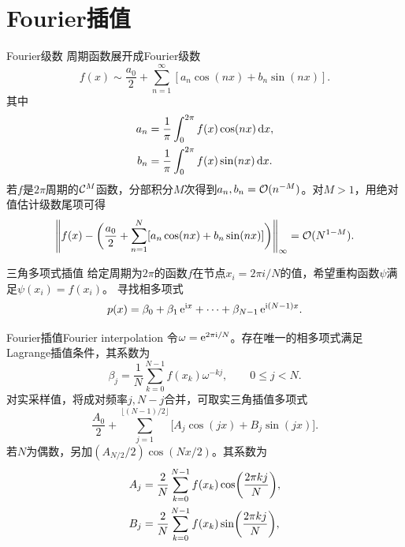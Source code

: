 \section{Fourier插值}
\label{sec:Fourier interpolation}

\begin{definition}
    {Fourier级数}{}
    周期函数展开成Fourier级数
    \begin{equation}
        f(x) \sim \frac{a_0}2 + \sum_{n=1}^\infty[a_n\cos(nx) + b_n\sin(nx)].
    \end{equation}
    其中
    \begin{subequations}
        \begin{align}
            a_n &= \frac1\pi\int_0^{2\pi}f(x)\cos(nx)\mathop{}\!\mathrm{d} x,\\
            b_n &= \frac1\pi\int_0^{2\pi}f(x)\sin(nx)\mathop{}\!\mathrm{d} x.
        \end{align}
    \end{subequations}
    \tcblower
    若$f$是$2\pi$周期的$\mathcal{C}^M$函数，分部积分$M$次得到$a_n,b_n = \mathcal{O}(n^{-M})$。对$M > 1$，用绝对值估计级数尾项可得
    \[
        \Biggl\lVert f(x) - \biggl(\frac{a_0}2 + \sum_{n=1}^N[a_n\cos(nx) + b_n\sin(nx)]\biggr)\Biggr\rVert_\infty = \mathcal{O}(N^{1-M}).
    \] 
\end{definition}

\begin{definition}
    {三角多项式插值}{}
    给定周期为$2\pi$的函数$f$在节点$x_i = 2\pi i/N$的值，希望重构函数$\psi$满足$\psi(x_i) = f(x_i)$。
    \tcblower
    寻找相多项式
    \begin{equation}
        p(x) = \beta_0 + \beta_1\mathop{}\!\mathrm{e}^{\mathrm{i} x} + \cdots + \beta_{N-1}\mathop{}\!\mathrm{e}^{\mathrm{i}(N-1)x}.
    \end{equation}
\end{definition}

\begin{theorem}
    {Fourier插值}{Fourier interpolation}
    令$\omega = \mathop{}\!\mathrm{e}^{2\pi\mathrm{i}/N}$。存在唯一的相多项式满足Lagrange插值条件，其系数为
    \begin{equation}
        \label{eqn:Fourier betaj}
        \beta_j = \frac1N\sum_{k=0}^{N-1}f(x_k)\omega^{-kj},\qquad 0 \leq j < N.
    \end{equation}
    对实采样值，将成对频率$j,N - j$合并，可取实三角插值多项式
    \begin{equation}\label{eq:na-real-trigonometric-interpolant}
        \frac{A_0}{2} + \sum_{j=1}^{\lfloor(N-1)/2\rfloor}
        \bigl[A_j\cos(jx) + B_j\sin(jx)\bigr].
    \end{equation}
    若$N$为偶数，另加$(A_{N/2}/2)\cos(Nx/2)$。其系数为
    \begin{subequations}
        \begin{align}
            A_j &= \frac2N\sum_{k=0}^{N-1}f(x_k)\cos\biggl(\frac{2\pi kj}N\biggr),\\
            B_j &= \frac2N\sum_{k=0}^{N-1}f(x_k)\sin\biggl(\frac{2\pi kj}N\biggr),
        \end{align}
    \end{subequations}
\end{theorem}





